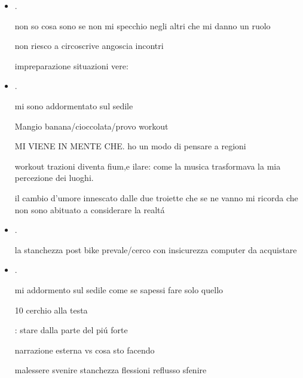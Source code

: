 \begin{itemize}
: restringimento vitalit\'a/congestione mente - mi sono addormentato riaddormentato e ancora in macchina

paura fare altro da abitudine

: aggressivit\'a sonno incontri improvvisi sguardo altro birra 

non sono abituato alla mia sensibilit\'a nelle interazioni

\item {}.

non so cosa sono se non mi specchio negli altri che mi danno un ruolo

non riesco a circoscrive angoscia incontri

impreparazione situazioni vere: 

\item {}.

mi sono addormentato sul sedile

Mangio banana/cioccolata/provo workout

MI VIENE IN MENTE CHE. ho un modo di pensare a regioni

workout trazioni diventa fium,e ilare: come la musica trasformava la mia percezione dei luoghi.

il cambio d'umore innescato dalle due troiette che se ne vanno mi ricorda che non sono abituato a considerare la realt\'a

\item {}.

la stanchezza post bike prevale/cerco con insicurezza computer da acquistare

\item {}.

mi addormento sul sedile come se sapessi fare solo quello

10 cerchio alla testa


: stare dalla parte del pi\'u forte

narrazione esterna vs cosa sto facendo

malessere svenire stanchezza flessioni reflusso sfenire



\end{itemize}
